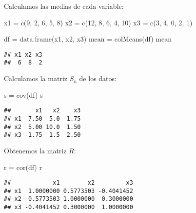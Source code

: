\documentclass[
]{article}
\newenvironment{Shaded}{\begin{snugshade}}{\end{snugshade}}
\newcommand{\DecValTok}[1]{\textcolor[rgb]{0.00,0.00,0.81}{#1}}
\newcommand{\FunctionTok}[1]{\textcolor[rgb]{0.00,0.00,0.00}{#1}}
\newcommand{\NormalTok}[1]{#1}
\newcommand{\OtherTok}[1]{\textcolor[rgb]{0.56,0.35,0.01}{#1}}
\begin{document}
Calculamos las medias de cada variable:

\begin{Shaded}
\begin{Highlighting}[]
\NormalTok{x1 }\OtherTok{=} \FunctionTok{c}\NormalTok{(}\DecValTok{9}\NormalTok{, }\DecValTok{2}\NormalTok{, }\DecValTok{6}\NormalTok{, }\DecValTok{5}\NormalTok{, }\DecValTok{8}\NormalTok{)}
\NormalTok{x2 }\OtherTok{=} \FunctionTok{c}\NormalTok{(}\DecValTok{12}\NormalTok{, }\DecValTok{8}\NormalTok{, }\DecValTok{6}\NormalTok{, }\DecValTok{4}\NormalTok{, }\DecValTok{10}\NormalTok{)}
\NormalTok{x3 }\OtherTok{=} \FunctionTok{c}\NormalTok{(}\DecValTok{3}\NormalTok{, }\DecValTok{4}\NormalTok{, }\DecValTok{0}\NormalTok{, }\DecValTok{2}\NormalTok{, }\DecValTok{1}\NormalTok{)}

\NormalTok{df }\OtherTok{=} \FunctionTok{data.frame}\NormalTok{(x1, x2, x3)}
\NormalTok{mean }\OtherTok{=} \FunctionTok{colMeans}\NormalTok{(df)}
\NormalTok{mean}
\end{Highlighting}
\end{Shaded}

\begin{verbatim}
## x1 x2 x3 
##  6  8  2
\end{verbatim}

Calculamos la matriz \(S_n\) de los datos:

\begin{Shaded}
\begin{Highlighting}[]
\NormalTok{s }\OtherTok{=} \FunctionTok{cov}\NormalTok{(df)}
\NormalTok{s}
\end{Highlighting}
\end{Shaded}

\begin{verbatim}
##       x1   x2    x3
## x1  7.50  5.0 -1.75
## x2  5.00 10.0  1.50
## x3 -1.75  1.5  2.50
\end{verbatim}

Obtenemos la matriz \(R\):

\begin{Shaded}
\begin{Highlighting}[]
\NormalTok{r }\OtherTok{=} \FunctionTok{cor}\NormalTok{(df)}
\NormalTok{r}
\end{Highlighting}
\end{Shaded}

\begin{verbatim}
##            x1        x2         x3
## x1  1.0000000 0.5773503 -0.4041452
## x2  0.5773503 1.0000000  0.3000000
## x3 -0.4041452 0.3000000  1.0000000
\end{verbatim}
\end{document}
